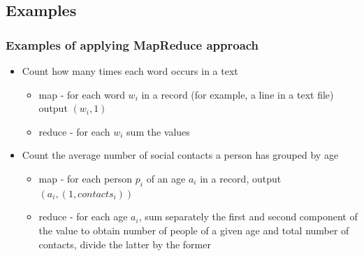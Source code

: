 \documentclass{beamer}
\begin{document}
\subsection{Examples}
\begin{frame}
  \frametitle{Examples of applying MapReduce approach}
  \begin{itemize}
  \item {\color{mycolordef}Count how many times each word occurs in a text}
    \begin{itemize}
      \item map - for each word {\color{mycolorcode}$w_i$} in a record (for example, a line in a text file) output {\color{mycolorcode}$(w_i,1)$}
      \item reduce - for each {\color{mycolorcode}$w_i$} sum the values
    \end{itemize}
  \item {\color{mycolordef}Count the average number of social contacts a person has grouped by age}
    \begin{itemize}
    \item map - for each person {\color{mycolorcode}$p_i$}  of an age {\color{mycolorcode}$a_i$} in a record, output {\color{mycolorcode}$(a_i, (1, contacts_i))$}
    \item reduce - for each age {\color{mycolorcode}$a_i$}, sum separately the first and second component of the value to obtain number 
      of people of a given age and total number of contacts, divide the latter by the former
    \end{itemize}
  \end{itemize}
\end{frame}
\end{document}
